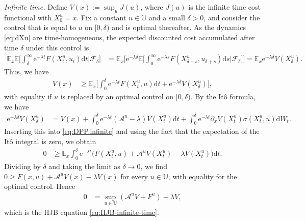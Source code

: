 \documentclass[12pt]{book}
\numberwithin{equation}{chapter}
\theoremstyle{plain}
\numberwithin{theorem}{section}
\theoremstyle{definition}
\numberwithin{exercise}{chapter}
\newcommand{\<}{\langle}
\renewcommand{\>}{\rangle}
\renewcommand{\(}{\left(}
\renewcommand{\)}{\right)}
\renewcommand{\[}{\left[}
\renewcommand{\]}{\right]}
\newcommand\Eb{\mathds{E}}
\newcommand\Ub{\mathds{U}}
\newcommand\Ac{\mathscr{A}}
\newcommand\Fc{\mathscr{F}}
\newcommand\sig{\sigma}
\newcommand\lam{\lambda}
\newcommand\del{\delta}
\renewcommand\d{\partial}
\newcommand\dd{\mathrm{d}}
\newcommand\ee{\mathrm{e}}
\begin{document}
\textit{Infinite time.}  Define $V(x) := \sup_u J(u)$, where $J(u)$ is the infinite time cost functional with $X_0^u = x$.  Fix a constant $u \in \Ub$ and a small $\del > 0$, and consider the control that is equal to $u$ on $[0,\del)$ and is optimal thereafter.  As the dynamics \eqref{eq:dXu} are time-homogeneous, the expected discounted cost accumulated after time $\del$ under this control is
\begin{align}
\Eb_x \Eb \Big[ \int_\del^\infty \ee^{-\lam t} F(X_t^u,u_t) \dd t \Big| \Fc_\del \Big]
	&=	\Eb_x \Big[ \ee^{-\lam \del} \Eb \Big[ \int_0^\infty \ee^{-\lam s} F(X_{\del + s}^u,u_{\del + s}) \dd s \Big| \Fc_\del \Big] \Big]
	=		\Eb_x \ee^{-\lam \del} V(X_\del^u) .
\end{align}
Thus, we have
\begin{align}
V(x)
	&\geq \Eb_x \Big[ \int_0^\del \ee^{-\lam t} F(X_t^u,u) \dd t + \ee^{-\lam \del} V(X_\del^u) \Big] , \label{eq:DPP.infinite}
\end{align}
with equality if $u$ is replaced by an optimal control on $[0,\del)$.  By the It\^o formula, we have
\begin{align}
\ee^{-\lam \del} V(X_\del^u)
	&=	V(x) + \int_0^\del \ee^{-\lam t} ( \Ac^u - \lam ) V(X_t^u) \dd t + \int_0^\del \ee^{-\lam t} \d_x V(X_t^u) \sig(X_t^u,u) \dd W_t .
\end{align}
Inserting this into \eqref{eq:DPP.infinite} and using the fact that the expectation of the It\^o integral is zero, we obtain
\begin{align}
0
	&\geq \Eb_x \int_0^\del \ee^{-\lam t} \Big( F(X_t^u,u) + \Ac^u V(X_t^u) - \lam V(X_t^u) \Big) \dd t .
\end{align}
Dividing by $\del$ and taking the limit as $\del \to 0$, we find $0 \geq F(x,u) + \Ac^u V(x) - \lam V(x)$ for every $u \in \Ub$, with equality for the optimal control.  Hence
\begin{align}
0
	&=	\sup_{u \in \Ub} ( \Ac^u V + F^u ) - \lam V ,
\end{align}
which is the HJB equation \eqref{eq:HJB-infinite-time}.
\end{document}
